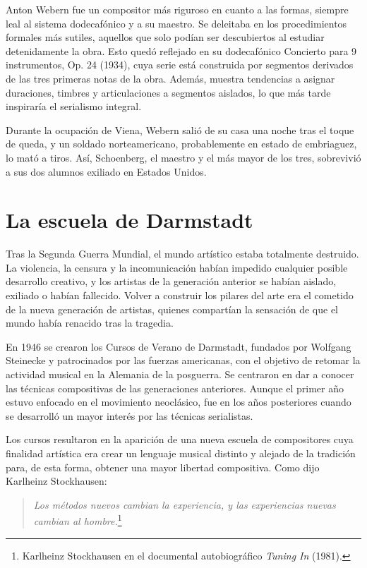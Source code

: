 	Anton Webern fue un compositor más riguroso en cuanto a las formas, siempre leal al sistema dodecafónico y a su maestro. Se deleitaba en los procedimientos formales más sutiles, aquellos que solo podían ser descubiertos al estudiar detenidamente la obra. Esto quedó reflejado en su dodecafónico Concierto para 9 instrumentos, Op. 24 (1934), cuya serie está construida por segmentos derivados de las tres primeras notas de la obra. Además, muestra tendencias a asignar duraciones, timbres y articulaciones a segmentos aislados, lo que más tarde inspiraría el serialismo integral.
        
	Durante la ocupación de Viena, Webern salió de su casa una noche tras el toque de queda, y un soldado norteamericano, probablemente en estado de embriaguez, lo mató a tiros. Así, Schoenberg, el maestro y el más mayor de los tres, sobrevivió a sus dos alumnos exiliado en Estados Unidos.
    
	\section{La escuela de Darmstadt}
	Tras la Segunda Guerra Mundial, el mundo artístico estaba totalmente destruido. La violencia, la censura y la incomunicación habían impedido cualquier posible desarrollo creativo, y los artistas de la generación anterior se habían aislado, exiliado o habían fallecido. Volver a construir los pilares del arte era el cometido de la nueva generación de artistas, quienes compartían la sensación de que el mundo había renacido tras la tragedia.
	
	En 1946 se crearon los Cursos de Verano de Darmstadt, fundados por Wolfgang Steinecke y patrocinados por las fuerzas americanas, con el objetivo de retomar la actividad musical en la Alemania de la posguerra. Se centraron en dar a conocer las técnicas compositivas de las generaciones anteriores. Aunque el primer año estuvo enfocado en el movimiento neoclásico, fue en los años posteriores cuando se desarrolló un mayor interés por las técnicas serialistas.
	
	Los cursos resultaron en la aparición de una nueva escuela de compositores cuya finalidad artística era crear un lenguaje musical distinto y alejado de la tradición para, de esta forma, obtener una mayor libertad compositiva. Como dijo Karlheinz Stockhausen:
	
	\begin{quote}
		\textit{Los métodos nuevos cambian la experiencia, y las experiencias nuevas cambian al hombre.}\footnote{Karlheinz Stockhausen en el documental autobiográfico \textit{Tuning In} (1981).}
	\end{quote}
	

